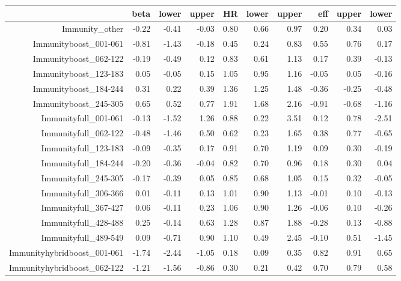 \begin{table}[ht]
\centering
\begin{tabular}{rrrrrrrrrr}
  \hline
 & beta & lower & upper & HR & lower & upper & eff & upper & lower \\ 
  \hline
Immunity\_other & -0.22 & -0.41 & -0.03 & 0.80 & 0.66 & 0.97 & 0.20 & 0.34 & 0.03 \\ 
  Immunityboost\_001-061 & -0.81 & -1.43 & -0.18 & 0.45 & 0.24 & 0.83 & 0.55 & 0.76 & 0.17 \\ 
  Immunityboost\_062-122 & -0.19 & -0.49 & 0.12 & 0.83 & 0.61 & 1.13 & 0.17 & 0.39 & -0.13 \\ 
  Immunityboost\_123-183 & 0.05 & -0.05 & 0.15 & 1.05 & 0.95 & 1.16 & -0.05 & 0.05 & -0.16 \\ 
  Immunityboost\_184-244 & 0.31 & 0.22 & 0.39 & 1.36 & 1.25 & 1.48 & -0.36 & -0.25 & -0.48 \\ 
  Immunityboost\_245-305 & 0.65 & 0.52 & 0.77 & 1.91 & 1.68 & 2.16 & -0.91 & -0.68 & -1.16 \\ 
  Immunityfull\_001-061 & -0.13 & -1.52 & 1.26 & 0.88 & 0.22 & 3.51 & 0.12 & 0.78 & -2.51 \\ 
  Immunityfull\_062-122 & -0.48 & -1.46 & 0.50 & 0.62 & 0.23 & 1.65 & 0.38 & 0.77 & -0.65 \\ 
  Immunityfull\_123-183 & -0.09 & -0.35 & 0.17 & 0.91 & 0.70 & 1.19 & 0.09 & 0.30 & -0.19 \\ 
  Immunityfull\_184-244 & -0.20 & -0.36 & -0.04 & 0.82 & 0.70 & 0.96 & 0.18 & 0.30 & 0.04 \\ 
  Immunityfull\_245-305 & -0.17 & -0.39 & 0.05 & 0.85 & 0.68 & 1.05 & 0.15 & 0.32 & -0.05 \\ 
  Immunityfull\_306-366 & 0.01 & -0.11 & 0.13 & 1.01 & 0.90 & 1.13 & -0.01 & 0.10 & -0.13 \\ 
  Immunityfull\_367-427 & 0.06 & -0.11 & 0.23 & 1.06 & 0.90 & 1.26 & -0.06 & 0.10 & -0.26 \\ 
  Immunityfull\_428-488 & 0.25 & -0.14 & 0.63 & 1.28 & 0.87 & 1.88 & -0.28 & 0.13 & -0.88 \\ 
  Immunityfull\_489-549 & 0.09 & -0.71 & 0.90 & 1.10 & 0.49 & 2.45 & -0.10 & 0.51 & -1.45 \\ 
  Immunityhybridboost\_001-061 & -1.74 & -2.44 & -1.05 & 0.18 & 0.09 & 0.35 & 0.82 & 0.91 & 0.65 \\ 
  Immunityhybridboost\_062-122 & -1.21 & -1.56 & -0.86 & 0.30 & 0.21 & 0.42 & 0.70 & 0.79 & 0.58 \\ 

\end{tabular}
\end{table}
